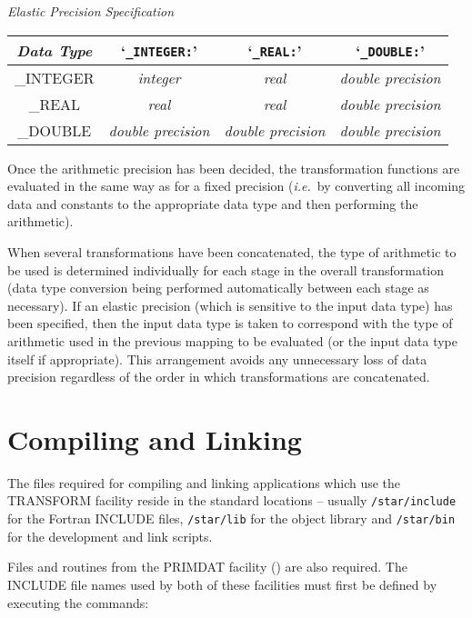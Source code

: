 \documentclass[twoside,nolof,11pt]{starlink}
\providecommand{\name}[1]{\small{#1}}
\begin{document}
\begin{center}
\emph{Elastic Precision Specification}\\
\begin{tabular}{|c|c|c|c|}
\hline
\emph{Data Type} & `\verb#_INTEGER:#' & `\verb#_REAL:#' & `\verb#_DOUBLE:#' \\
\hline
\name{\_INTEGER} & \emph{integer} & \emph{real} & \emph{double precision} \\
\name{\_REAL} & \emph{real} & \emph{real} & \emph{double precision} \\
\name{\_DOUBLE} & \emph{double precision} & \emph{double precision} & \emph{double precision}\\
\hline
\end{tabular}
\end{center}


Once the arithmetic precision has been decided, the transformation functions
are evaluated in the same way as for a fixed precision (\emph{i.e.}\ by
converting all incoming data and constants to the appropriate data type and
then performing the arithmetic).

When several transformations have been concatenated, the type of arithmetic
to be used is determined individually for each stage in the overall
transformation (data type conversion being performed automatically between
each stage as necessary).
If an elastic precision (which is sensitive to the input data type) has been
specified, then the input data type is taken to correspond with the type of
arithmetic used in the previous mapping to be evaluated (or the input data
type itself if appropriate).
This arrangement avoids any unnecessary loss of data precision regardless of
the order in which transformations are concatenated.


\section{Compiling and Linking}

The files required for compiling and linking applications which use the
\name{TRANSFORM} facility reside in the standard locations -- usually
\texttt{/star/include} for the Fortran \name{INCLUDE} files,
\texttt{/star/lib} for the object library and \texttt{/star/bin} for the
development and link scripts.

Files and routines from the \name{PRIMDAT} facility ()
are also required.
The \name{INCLUDE} file names used by both of these facilities must first
be defined by executing the commands:
\end{document}
